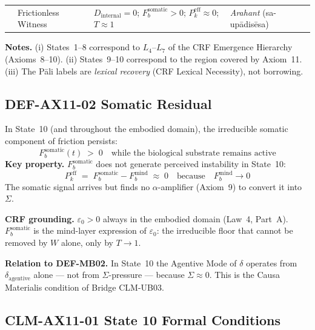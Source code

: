 \documentclass[12pt, a4paper]{article}
\providecommand{\eps}{\varepsilon_0}
\providecommand{\Fbsom}{F_b^{\mathrm{somatic}}}
\providecommand{\Pkeff}{P_k^{\mathrm{eff}}}
\providecommand{\Dint}{D_{\mathrm{internal}}}
\begin{document}
\begin{formalbox}[title={DEF-AX11-01: State Architecture
  (II.5.C $\to$ CRF)}]
{\begin{longtable}{>{\centering}p{0.9cm}
                  >{\raggedright\arraybackslash}p{2.8cm}
                  >{\raggedright\arraybackslash}p{5.2cm}
                  >{\raggedright\arraybackslash}p{2.8cm}}
10 & Frictionless Witness &
  $\Dint = 0$;\; $\Fbsom > 0$;\;
  $\Pkeff \approx 0$;\; $T \approx 1$ &
  \textit{Arahant} (sa-up\={a}dis\={e}sa) \\

\end{longtable}
}
\vspace{-\parskip}

\textbf{Notes.}
(i) States~1--8 correspond to $L_4$--$L_7$ of the CRF Emergence
Hierarchy (Axioms~8--10). (ii) States~9--10 correspond to the
region covered by Axiom~11. (iii) The Pāli labels are
\emph{lexical recovery} (CRF Lexical Necessity), not borrowing.
\end{formalbox}

\subsection{DEF-AX11-02 \quad Somatic Residual}


\begin{formalbox}[title={DEF-AX11-02: Somatic Residual
  $\Fbsom$}]
In State~10 (and throughout the embodied domain), the irreducible
somatic component of friction persists:
\[
  \Fbsom(t) \;>\; 0 \quad
  \text{while the biological substrate remains active}
\]
\textbf{Key property.} $\Fbsom$ does not generate perceived
instability in State~10:
\[
  \Pkeff \;=\; \Fbsom - F_b^{\mathrm{mind}} \;\approx\; 0
  \quad\text{because}\quad F_b^{\mathrm{mind}} \to 0
\]
The somatic signal arrives but finds no $\alpha$-amplifier
(Axiom~9) to convert it into $\Sigma$.

\textbf{CRF grounding.}
$\eps > 0$ always in the embodied domain (Law~4, Part~A).
$\Fbsom$ is the mind-layer expression of $\eps$: the irreducible
floor that cannot be removed by $W$ alone, only by $T \to 1$.

\textbf{Relation to DEF-MB02.}
In State~10 the Agentive Mode of $\delta$ operates from
$\delta_{\mathrm{agentive}}$ alone --- not from $\Sigma$-pressure
--- because $\Sigma \approx 0$. This is the Causa Materialis
condition of Bridge CLM-UB03.
\end{formalbox}

\subsection{CLM-AX11-01 \quad State 10 Formal Conditions}
\end{document}
